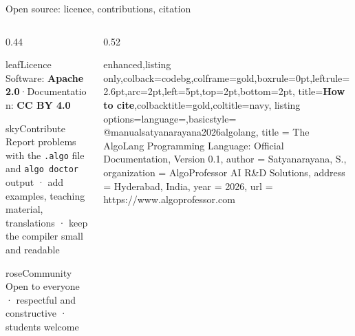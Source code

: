 \documentclass[aspectratio=169,11pt]{beamer}
\begin{document}
\begin{frame}[fragile]{Open source: licence, contributions, citation}
\vspace{1mm}
\begin{columns}[T]
\begin{column}{0.44\textwidth}
\begin{card}{leaf}{Licence}
Software: \textbf{Apache 2.0}\enspace·\enspace Documentation: \textbf{CC BY 4.0}
\end{card}
\begin{card}{sky}{Contribute}
Report problems with the \texttt{.algo} file and \texttt{algo doctor} output · add examples, teaching material, translations · keep the compiler small and readable
\end{card}
\begin{card}{rose}{Community}
Open to everyone · respectful and constructive · students welcome
\end{card}
\end{column}
\begin{column}{0.52\textwidth}
\begin{tcblisting}{enhanced,listing only,colback=codebg,colframe=gold,boxrule=0pt,leftrule=2.6pt,arc=2pt,left=5pt,top=2pt,bottom=2pt,
  title={\bfseries\scriptsize How to cite},colbacktitle=gold,coltitle=navy,
  listing options={language={},basicstyle=\ttfamily\fontsize{6}{7.2}\selectfont}}
@manual{satyanarayana2026algolang,
  title  = {The {AlgoLang} Programming Language:
            Official Documentation, Version 0.1},
  author = {Satyanarayana, S.},
  organization = {AlgoProfessor AI R\&D Solutions},
  address = {Hyderabad, India},
  year   = {2026},
  url    = {https://www.algoprofessor.com}
}
\end{tcblisting}
\end{column}
\end{columns}
\end{frame}
\end{document}
